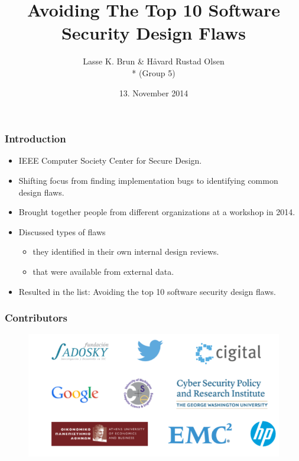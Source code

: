 \documentclass[12pt,norsk]{beamer}
\title[Avoiding The Top 10 Software Security Design Flaws]{Avoiding The Top 10 Software Security Design Flaws}
\author{Lasse K. Brun \& Håvard Rustad Olsen \\* (Group 5)} %
\institute[UiB]
{
\medskip
\textit{lkbrun@gmail.com \& haavard.olsen@live.com} \\* %
\textit{INF226 - Software Security, Fall 2014 }
}
\date{13. November 2014} %
\begin{document}
 

\begin{frame}
\titlepage %
\end{frame}


\begin{frame}
	
	\frametitle{Introduction}

	\begin{itemize}
		\item IEEE Computer Society Center for Secure Design.
		\item Shifting focus from finding implementation bugs to identifying common design flaws.
		\item Brought together people from different organizations at a workshop in 2014.
		\item Discussed types of flaws
		\begin{itemize}
			\item they identified in their own internal design reviews.
			\item that were available from external data.
		\end{itemize}
		\item Resulted in the list: Avoiding the top 10 software security design flaws.
	\end{itemize}		

\end{frame}


\begin{frame}
	
	\frametitle{Contributors}
	
	\begin{figure}[h]
    \centering
    \includegraphics[scale=0.50]{images/contributors.png}
    
\end{figure}
	
\end{frame}
\end{document}
